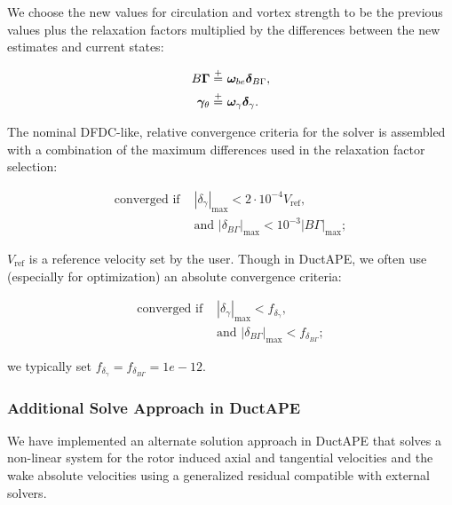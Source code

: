 We choose the new values for circulation and vortex strength to be the previous values plus the relaxation factors multiplied by the differences between the new estimates and current states:

\begin{align}
   \label{eqn:updatecirculation}
   B\bm{\Gamma} \stackrel{+}{=}&~ \bm{\omega}_{be} \bm{\delta}_{B\Gamma}, \\
   \label{eqn:updategammatheta}
   \bm{\gamma}_\theta \stackrel{+}{=}&~ \bm{\omega}_\gamma \bm{\delta}_\gamma.
\end{align}

The nominal DFDC-like, relative convergence criteria for the solver is assembled with a combination of the maximum differences used in the relaxation factor selection:

\begin{equation}
   \label{eqn:convergencecrit}
   \begin{aligned}
       \text{converged if } &|\delta_\gamma|_\text{max} < 2\cdot10^{-4} V_\text{ref}, \\
   &\text{and  } |\delta_{B\Gamma}|_\text{max} < 10^{-3}|B\Gamma|_\text{max};
   \end{aligned}
\end{equation}

\where \(V_\text{ref}\) is a reference velocity set by the user.
%
Though in DuctAPE, we often use (especially for optimization) an absolute convergence criteria:

\begin{equation}
   \label{eqn:convergencecritabs}
   \begin{aligned}
       \text{converged if } &|\delta_\gamma|_\text{max} < f_{\delta_\gamma}, \\
                &\text{and  } |\delta_{B\Gamma}|_\text{max} < f_{\delta_{B\Gamma}};
   \end{aligned}
\end{equation}

\where we typically set \(f_{\delta_\gamma}=f_{\delta_{B\Gamma}}=1e-12\).


\subsubsection{Additional Solve Approach in DuctAPE}

We have implemented an alternate solution approach in DuctAPE that solves a non-linear system for the rotor induced axial and tangential velocities and the wake absolute velocities using a generalized residual compatible with external solvers.

